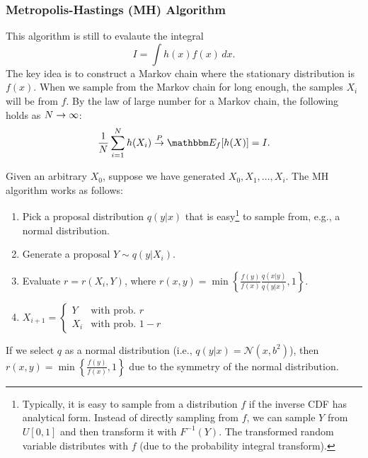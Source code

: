     \subsubsection{Metropolis-Hastings (MH) Algorithm}
        This algorithm is still to evalaute the integral
            \begin{equation}
                I = \int h(x) f(x) \, d x.
            \end{equation}
        The key idea is to construct a Markov chain where the stationary distribution is $f(x)$.
        When we sample from the Markov chain for long enough, the samples $X_i$ will be from $f$.
        By the law of large number for a Markov chain, the following holds as $N \rightarrow \infty$: 
            \begin{equation}
                \frac{1}{\ndata}\sum_{i=1}^{\ndata}{h(X_i)} \stackrel{P}{\rightarrow} \E_{f}[h(X)] = I.
            \end{equation}

        Given an arbitrary $X_0$, suppose we have generated $X_0, X_1, \ldots, X_i$.
        The MH algorithm works as follows:
            \begin{enumerate}
                \item Pick a proposal distribution $q(y|x)$ that is easy\footnote{Typically, it is easy to sample from a distribution $f$ if the inverse CDF has analytical form. 
                Instead of directly sampling from $f$, we can sample $Y$ from $U[0, 1]$ and then transform it with $F^{-1}(Y)$. The transformed random variable distributes with $f$ (due to the probability integral transform). } to sample from, e.g., a normal distribution. 
                \item Generate a proposal $Y \sim q(y | X_i)$.
                \item Evaluate $r=r(X_i, Y)$, where $r(x, y) = \min\left\{ \frac{f(y)}{f(x)}\frac{q(x|y)}{q(y|x)}, 1\right\}$.
                \item $X_{i+1} = \begin{cases} Y & \text{with prob. } r \\ X_i & \text{with prob. } 1-r  \end{cases}$
            \end{enumerate}

        If we select $q$ as a normal distribution (i.e., $q(y|x) = \mathcal{N}(x, b^2)$), then  $r(x, y) = \min \left\{ \frac{f(y)}{f(x)}, 1 \right\}$ due to the symmetry of the normal distribution.


